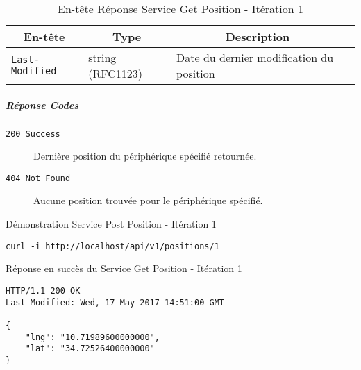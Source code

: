 \begin{appendices}
\begin{table}[htbp]
    \centering
    \caption{En-tête Réponse Service Get Position - Itération 1}
    \begin{tabular}{|l | l | l | l|}
        \hline
        \multicolumn{1}{|c|}{\textbf{En-tête}} &
        \multicolumn{1}{c|}{\textbf{Type}} &
        \multicolumn{1}{c|}{\textbf{Description}} \\ \hline
        \verb|Last-Modified| & string (RFC1123) & Date du dernier modification du position \\ \hline
    \end{tabular}
\end{table}

\subparagraph*{Réponse Codes}
\begin{description}
    \item[\texttt{200 Success}] Dernière position du périphérique spécifié retournée.
    \item[\texttt{404 Not Found}] Aucune position trouvée pour le périphérique spécifié.
\end{description}

\begin{listing}
    \caption{Démonstration Service Post Position - Itération 1}
\begin{verbatim}
curl -i http://localhost/api/v1/positions/1
\end{verbatim}
\end{listing}

\begin{listing}[htbp]
    \caption{Réponse en succès du Service Get Position - Itération 1}
\begin{verbatim}
HTTP/1.1 200 OK
Last-Modified: Wed, 17 May 2017 14:51:00 GMT

{
    "lng": "10.71989600000000",
    "lat": "34.72526400000000"
}
\end{verbatim}
\end{listing}

\end{appendices}
